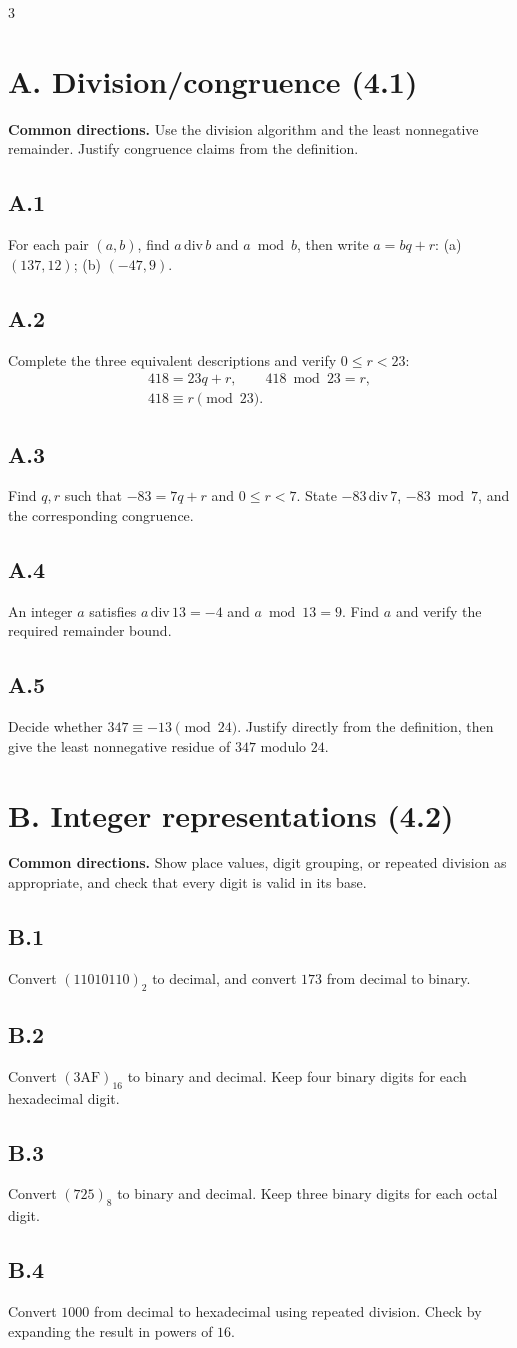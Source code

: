 \documentclass{article}
\newcommand{\problem}[1]{\par\subsection*{#1}}
\begin{document}
\begin{multicols*}{3}

\section*{A. Division/congruence (4.1)}

\textbf{Common directions.} Use the division algorithm and the least
nonnegative remainder. Justify congruence claims from the definition.

\problem{A.1}
For each pair $(a,b)$, find $a\,\mathrm{div}\,b$ and $a\bmod b$, then write
$a=bq+r$: (a) $(137,12)$; (b) $(-47,9)$.

\vfill
\problem{A.2}
Complete the three equivalent descriptions and verify $0\le r<23$:
\[
\begin{gathered}
418=23q+r,\qquad 418\bmod 23=r,\\
418\equiv r\pmod{23}.
\end{gathered}
\]

\vfill
\problem{A.3}
Find $q,r$ such that $-83=7q+r$ and $0\le r<7$. State
$-83\,\mathrm{div}\,7$, $-83\bmod7$, and the corresponding congruence.

\vfill
\problem{A.4}
An integer $a$ satisfies $a\,\mathrm{div}\,13=-4$ and $a\bmod13=9$.
Find $a$ and verify the required remainder bound.

\vfill
\problem{A.5}
Decide whether $347\equiv-13\pmod{24}$. Justify directly from the definition,
then give the least nonnegative residue of $347$ modulo $24$.

\columnbreak

\section*{B. Integer representations (4.2)}

\textbf{Common directions.} Show place values, digit grouping, or repeated
division as appropriate, and check that every digit is valid in its base.

\problem{B.1}
Convert $(11010110)_2$ to decimal, and convert $173$ from decimal to binary.

\vfill
\problem{B.2}
Convert $(\mathrm{3AF})_{16}$ to binary and decimal. Keep four binary digits
for each hexadecimal digit.

\vfill
\problem{B.3}
Convert $(725)_8$ to binary and decimal. Keep three binary digits for each
octal digit.

\vfill
\problem{B.4}
Convert $1000$ from decimal to hexadecimal using repeated division. Check by
expanding the result in powers of $16$.


\end{multicols*}
\end{document}
